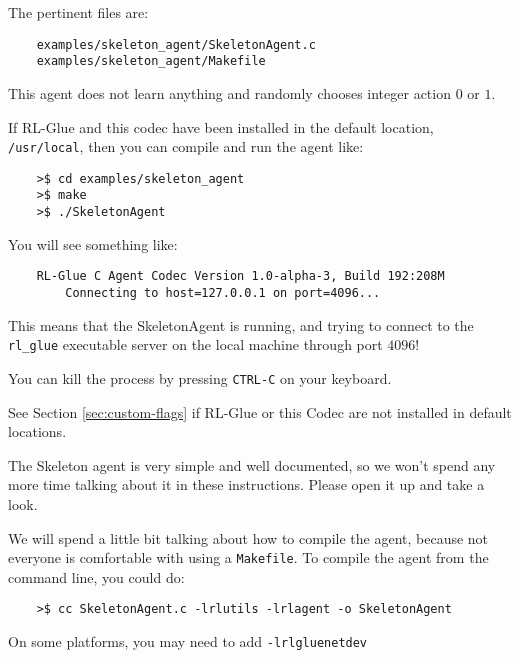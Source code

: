 \documentclass[11pt]{article}
\begin{document}
The pertinent files are:
\begin{verbatim}
	examples/skeleton_agent/SkeletonAgent.c
	examples/skeleton_agent/Makefile
\end{verbatim}

This agent does not learn anything and randomly chooses integer action $0$ or $1$.  

If RL-Glue and this codec have been installed in the default location, \texttt{/usr/local}, then you can compile and run the agent like:
\begin{verbatim}
	>$ cd examples/skeleton_agent
	>$ make
	>$ ./SkeletonAgent
\end{verbatim}

You will see something like:
\begin{verbatim}
	RL-Glue C Agent Codec Version 1.0-alpha-3, Build 192:208M
		Connecting to host=127.0.0.1 on port=4096...
\end{verbatim}

This means that the SkeletonAgent is running, and trying to connect to the \texttt{rl\_glue} executable server on the local machine through port $4096$! 

You can kill the process by pressing \texttt{CTRL-C} on your keyboard.

See Section \ref{sec:custom-flags} if RL-Glue or this Codec are not installed in default locations.

The Skeleton agent is very simple and well documented, so we won't spend any more time talking about it in these instructions.
Please open it up and take a look.

We will spend a little bit talking about how to compile the agent, because not everyone is comfortable with using a \texttt{Makefile}.  To compile
the agent from the command line, you could do:
\begin{verbatim}
	>$ cc SkeletonAgent.c -lrlutils -lrlagent -o SkeletonAgent
\end{verbatim}

On some platforms, you may need to add \texttt{-lrlgluenetdev}
\end{document}
